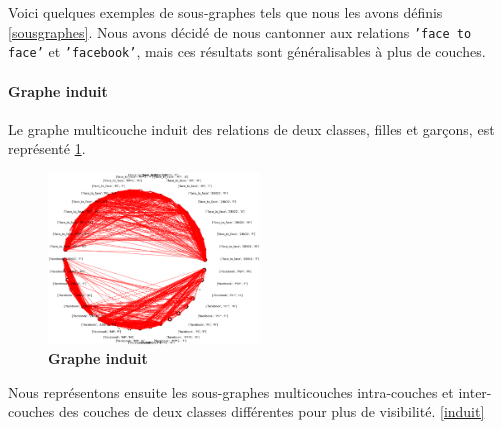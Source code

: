 \documentclass[11pt,a4paper]{article}
\theoremstyle{definition}
\theoremstyle{remark}
\theoremstyle{remark}
\begin{document}
Voici quelques exemples de sous-graphes tels que nous les avons définis \cref{sousgraphes}. Nous avons décidé de nous cantonner aux relations \texttt{'face to face'} et \texttt{'facebook'}, mais ces résultats sont généralisables à plus de couches. 




\paragraph{Graphe induit}
	Le graphe multicouche induit des relations de deux classes, filles et garçons, est représenté \cref{completinduit}.
	
\begin{figure}[H]
	\centering
	\includegraphics[width=0.5\textwidth]{tout.png}
	\caption{\textbf{Graphe induit}}
	\label{completinduit}
\end{figure}

	Nous représentons ensuite les sous-graphes multicouches intra-couches et inter-couches des couches de deux classes différentes pour plus de visibilité. \cref{induit}
\end{document}
